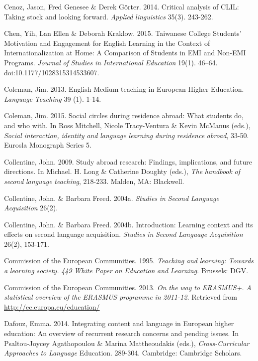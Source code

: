 Cenoz, Jason, Fred Genesee \& Derek Görter. 2014. Critical analysis of CLIL: Taking stock and looking forward. \textit{Applied} \textit{linguistics} 35(3). 243-262.

Chen, Yih, Lan Ellen \& Deborah Kraklow. 2015. Taiwanese College Students’ Motivation and Engagement for English Learning in the Context of Internationalization at Home: A Comparison of Students in EMI and Non-EMI Programs. \textit{Journal} \textit{of} \textit{Studies} \textit{in} \textit{International} \textit{Education} 19(1). 46–64. doi:10.1177/1028315314533607.

Coleman, Jim. 2013. English-Medium teaching in European Higher Education. \textit{Language} \textit{Teaching} 39 (1). 1-14.

Coleman, Jim. 2015. Social circles during residence abroad: What students do, and who with. In Ross Mitchell, Nicole Tracy-Ventura \& Kevin McManus (eds.), \textit{Social} \textit{interaction,} \textit{identity} \textit{and} \textit{language} \textit{learning} \textit{during} \textit{residence} \textit{abroad}, 33-50. Eurosla Monograph Series 5.

Collentine, John. 2009. Study abroad research: Findings, implications, and future directions. In Michael. H. Long \& Catherine Doughty (eds.), \textit{The} \textit{handbook} \textit{of} \textit{second} \textit{language} \textit{teaching}, 218-233. Malden, MA: Blackwell.

Collentine, John. \& Barbara Freed. 2004a. \textit{Studies} \textit{in} \textit{Second} \textit{Language} \textit{Acquisition} 26(2).

Collentine, John. \& Barbara Freed. 2004b. Introduction: Learning context and its effects on second language acquisition. \textit{Studies} \textit{in} \textit{Second} \textit{Language} \textit{Acquisition} 26(2), 153-171.

Commission of the European Communities. 1995. \textit{Teaching} \textit{and} \textit{learning:} \textit{Towards} \textit{a} \textit{learning} \textit{society.} \textit{449} \textit{White} \textit{Paper} \textit{on} \textit{Education} \textit{and} \textit{Learning}. Brussels: DGV.

Commission of the European Communities. 2013. \textit{On} \textit{the} \textit{way} \textit{to} \textit{ERASMUS+.} \textit{A} \textit{statistical} \textit{overview} \textit{of} \textit{the} \textit{ERASMUS} \textit{programme} \textit{in} \textit{2011-12.} Retrieved from \url{http://ec.europa.eu/education/}

\begin{styletextbox}
Dafouz, Emma. 2014. Integrating content and language in European higher education: An overview of recurrent research concerns and pending issues. In Psaltou-Joycey Agathopoulou \& Marina Mattheoudakis (eds.), \textit{Cross-Curricular} \textit{Approaches} \textit{to} \textit{Language} Education. 289-304. Cambridge: Cambridge Scholars. 
\end{styletextbox}

